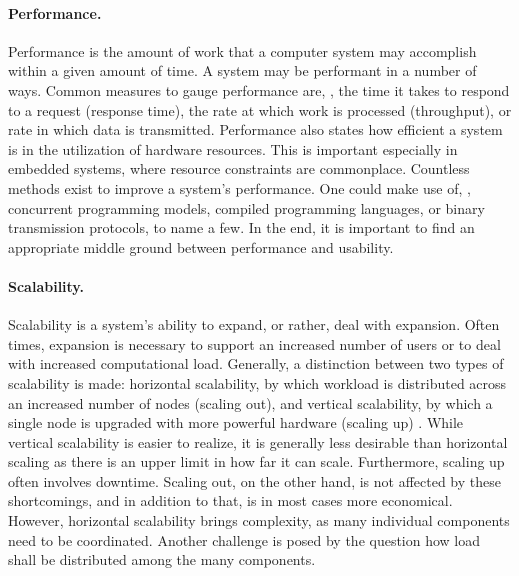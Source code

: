 \paragraph{Performance.}
Performance is the amount of work that a computer system may accomplish within a given amount of time. A system may be performant in a number of ways. Common measures to gauge performance are, \eg , the time it takes to respond to a request (response time), the rate at which work is processed (throughput), or rate in which data is transmitted. Performance also states how efficient a system is in the utilization of hardware resources. This is important especially in embedded systems, where resource constraints are commonplace. Countless methods exist to improve a system's performance. One could make use of, \eg , concurrent programming models, compiled programming languages, or binary transmission protocols, to name a few. In the end, it is important to find an appropriate middle ground between performance and usability.

\paragraph{Scalability.}
Scalability is a system's ability to expand, or rather, deal with expansion. Often times, expansion is necessary to support an increased number of users or to deal with increased computational load. Generally, a distinction between two types of scalability is made: horizontal scalability, by which workload is distributed across an increased number of nodes (scaling out), and vertical scalability, by which a single node is upgraded with more powerful hardware (scaling up) \cite{tanenbaum2017distributed}. While vertical scalability is easier to realize, it is generally less desirable than horizontal scaling as there is an upper limit in how far it can scale. Furthermore, scaling up often involves downtime. Scaling out, on the other hand, is not affected by these shortcomings, and in addition to that, is in most cases more economical. However, horizontal scalability brings complexity, as many individual components need to be coordinated. Another challenge is posed by the question how load shall be distributed among the many components.

